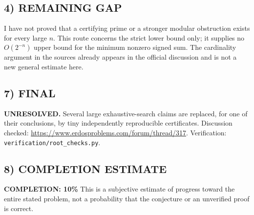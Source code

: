 \subsection*{4) REMAINING GAP}
I have not proved that a certifying prime or a stronger modular obstruction exists for every large $n$. This route concerns the strict lower bound only; it supplies no $O(2^{-n})$ upper bound for the minimum nonzero signed sum. The cardinality argument in the sources already appears in the official discussion and is not a new general estimate here.
\subsection*{7) FINAL}
\textbf{UNRESOLVED.} Several large exhaustive-search claims are replaced, for one of their conclusions, by tiny independently reproducible certificates.
\noindent Discussion checked: \url{https://www.erdosproblems.com/forum/thread/317}. Verification: \texttt{verification/root\_checks.py}.

\subsection*{8) COMPLETION ESTIMATE}
\textbf{COMPLETION: 10\%}
This is a subjective estimate of progress toward the entire stated problem, not a probability that the conjecture or an unverified proof is correct.
